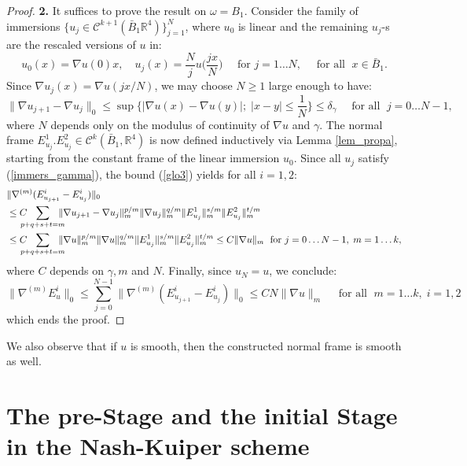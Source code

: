 \documentclass[reqno,twoside,11pt]{amsart}
\newcommand{\R}{\mathbb{R}}
\numberwithin{equation}{section}
\theoremstyle{plain}
\theoremstyle{definition}
\begin{document}
\begin{proof}
{\bf 2.} It suffices to prove the result on $\omega=B_1$. Consider the family of immersions
$\{u_j\in\mathcal{C}^{k+1}(\bar B_1 \R^4)\}_{j=1}^N$, where $u_0$ is
linear and the remaining $u_j$-s are the rescaled versions of $u$ in:
$$u_0(x) = \nabla u(0)x,\quad u_j(x) =
\frac{N}{j}u\big(\frac{jx}{N}\big) \quad\mbox{ for } j=1\ldots N,
\quad \mbox{ for all } \; x\in \bar B_1.$$
Since $\nabla u_j(x) =\nabla u(jx/N)$, we may choose $N\geq 1$ large enough to have:
$$\|\nabla u_{j+1}-\nabla u_j\|_0\leq \sup\big\{|\nabla u(x) -\nabla
u(y)|; \; |x-y|\leq \frac{1}{N}\big\}\leq \delta_\gamma\quad\mbox{ for
  all }\; j=0\ldots N-1,$$
where $N$ depends only on the modulus of continuity of $\nabla u$ and $\gamma$.
The normal frame $E^1_{u_j}. E^2_{u_j}\in\mathcal{C}^k(\bar B_1,\R^4)$
is now defined inductively via Lemma \ref{lem_propa}, starting from
the constant frame of  the linear immersion $u_0$. Since
all $u_j$ satisfy (\ref{immers_gamma}), the bound (\ref{glo3}) yields
for all $i=1,2$:
\begin{equation*}
\begin{split}    
& \|\nabla^{(m)}(E^i_{u_{j+1}}-E^i_{u_j})\|_0\\ & \leq C \hspace{-3mm}\sum_{p+q+s+t=m} \hspace{-3mm}
\|\nabla u_{j+1}-\nabla u_j\|_m^{p/m}\|\nabla u_j\|_m^{q/m} \|E^1_{u_j}\|_m^{s/m} \|E^2_{u_j}\|_m^{t/m}
\\ & \leq C \hspace{-3mm}\sum_{p+q+s+t=m} \hspace{-3mm}
\|\nabla u\|_m^{p/m}\|\nabla u\|_m^{q/m} \|E^1_{u_j}\|_m^{s/m} \|E^2_{u_j}\|_m^{t/m}
\leq C \|\nabla u\|_m \;\mbox{ for } j=0\ldots N-1, \; m=1\ldots k,
\end{split}
\end{equation*}
where $C$ depends on $\gamma, m$ and $N$. Finally, since $u_N=u$, we conclude:
$$\|\nabla^{(m)}E^i_u\|_0 \leq\sum_{j=0}^{N-1}\|\nabla^{(m)}(E^i_{u_{j+1}}-E^i_{u_j})\|_0
\leq CN \|\nabla u\|_m \quad \mbox{ for all }\; m=1\ldots k, \; i=1,2$$
which ends the proof.
\end{proof}

\noindent We also observe that if $u$ is smooth, then the
constructed normal frame is smooth as well.

\section{The pre-Stage and the initial Stage in the Nash-Kuiper scheme}\label{sec_NK0}
\end{document}
